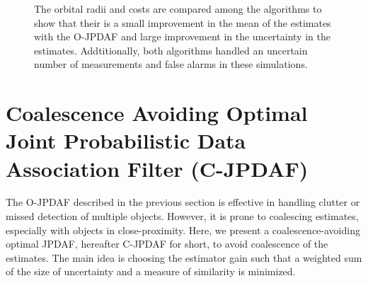\documentclass[10pt]{article}
\theoremstyle{plain}\theorembodyfont{\normalfont}
\begin{document}
\begin{figure}
{	
	}
\caption{The orbital radii and costs are compared among the algorithms to show that their is a small improvement in the mean of the estimates with the O-JPDAF and large improvement in the uncertainty in the estimates. Addtitionally, both algorithms handled an uncertain number of measurements and false alarms in these simulations.
}\label{fig:hoverRegions}
\end{figure}






























%
%
\section{Coalescence Avoiding Optimal Joint Probabilistic Data Association Filter (C-JPDAF)}%
\label{C-JPDAF}

The O-JPDAF described in the previous section is effective in handling clutter or missed detection of multiple objects. However, it is prone to coalescing estimates, especially with objects in close-proximity. Here, we present a coalescence-avoiding optimal JPDAF, hereafter C-JPDAF for short, to avoid coalescence of the estimates. The main idea is choosing the estimator gain such that a weighted sum of the size of uncertainty and a measure of similarity is minimized. 
\end{document}

